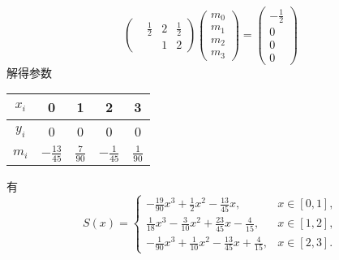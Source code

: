 \documentclass{sjtuarticle}
\begin{document}
\begin{itemize}
\begin{solution}
\begin{itemize}
\begin{equation*}
\begin{pmatrix}
                    & \frac{1}{2} & 2 & \frac{1}{2} \\
                    & & 1 & 2
                \end{pmatrix}
                \begin{pmatrix}
                    m_0 \\ m_1 \\ m_2 \\ m_3
                \end{pmatrix}
                =\begin{pmatrix}
                    -\frac{1}{2} \\ 0 \\ 0 \\ 0
                \end{pmatrix}
            \end{equation*}
            解得参数
            \begin{table}[H]
                \centering
                \begin{tabular}{c*{4}{c}}
                    \toprule
                    $x_i$ & 0 & 1 & 2 & 3 \\
                    \midrule
                    $y_i$ & 0 & 0 & 0 & 0 \\
                    $m_i$ & $-\frac{13}{45}$ & $\frac{7}{90}$ & $-\frac{1}{45}$ & $\frac{1}{90}$ \\
                    \bottomrule
                \end{tabular}
            \end{table}
            有
            \begin{equation*}
                S(x)=\begin{cases}
                    - \frac{19 }{90}x^{3} + \frac{1}{2}x^{2} - \frac{13 }{45}x,& x\in[0,1],\\
                    \frac{1}{18}x^{3} - \frac{3 }{10}x^{2} + \frac{23 }{45}x - \frac{4}{15},&x\in[1,2],\\
                    - \frac{1}{90}x^{3} + \frac{1}{10}x^{2} - \frac{13 }{45}x + \frac{4}{15},&x\in[2,3].
                \end{cases}
            \end{equation*}
        \end{itemize}
    \end{solution}
\end{itemize}
\end{document}
